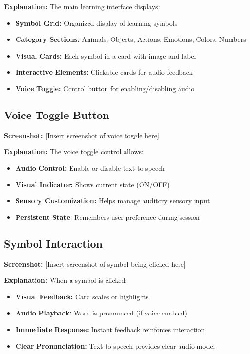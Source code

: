 \documentclass[12pt,a4paper]{article}
\begin{document}
\textbf{Explanation:}
The main learning interface displays:
\begin{itemize}
    \item \textbf{Symbol Grid:} Organized display of learning symbols
    \item \textbf{Category Sections:} Animals, Objects, Actions, Emotions, Colors, Numbers
    \item \textbf{Visual Cards:} Each symbol in a card with image and label
    \item \textbf{Interactive Elements:} Clickable cards for audio feedback
    \item \textbf{Voice Toggle:} Control button for enabling/disabling audio
\end{itemize}

\subsection{Voice Toggle Button}
\textbf{Screenshot:} [Insert screenshot of voice toggle here]

\textbf{Explanation:}
The voice toggle control allows:
\begin{itemize}
    \item \textbf{Audio Control:} Enable or disable text-to-speech
    \item \textbf{Visual Indicator:} Shows current state (ON/OFF)
    \item \textbf{Sensory Customization:} Helps manage auditory sensory input
    \item \textbf{Persistent State:} Remembers user preference during session
\end{itemize}

\subsection{Symbol Interaction}
\textbf{Screenshot:} [Insert screenshot of symbol being clicked here]

\textbf{Explanation:}
When a symbol is clicked:
\begin{itemize}
    \item \textbf{Visual Feedback:} Card scales or highlights
    \item \textbf{Audio Playback:} Word is pronounced (if voice enabled)
    \item \textbf{Immediate Response:} Instant feedback reinforces interaction
    \item \textbf{Clear Pronunciation:} Text-to-speech provides clear audio model
\end{itemize}
\end{document}
